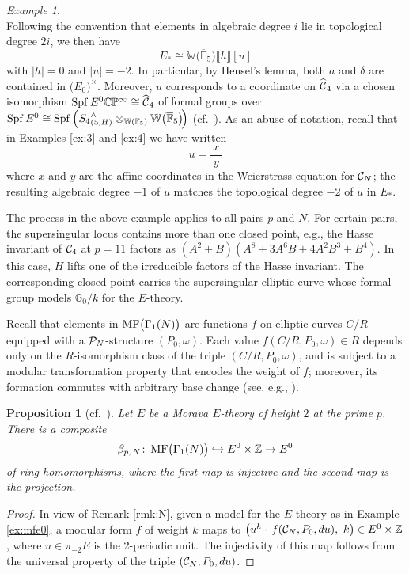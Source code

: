 \documentclass{gtpart}
\newtheorem{prop}[thm]{Proposition}
\theoremstyle{definition}
\theoremstyle{remark}
\newtheorem{ex}[thm]{Example}
\def\co{\colon\thinspace}
\newcommand{\mb}[1]{\mathbb{#1}}
\newcommand{\Spf}{{\rm Spf\thinspace}}
\newcommand{\cF}{\overline {\mb F}}
\newcommand{\CC}{{\cal C}}
\newcommand{\CP}{{\cal P}}
\newcommand{\BC}{{\mb C}}
\newcommand{\BF}{{\mb F}}
\newcommand{\BG}{{\mb G}}
\newcommand{\BP}{{\mb P}}
\newcommand{\BW}{{\mb W}}
\newcommand{\BZ}{{\mb Z}}
\newcommand{\HCC}{\widehat{~\!\!\CC}}
\newcommand{\MF}{{\rm MF}}
\newcommand{\B}{\beta}
\renewcommand{\d}{\delta}
\newcommand{\G}{\Gamma}
\newcommand{\lb}{\llbracket}
\newcommand{\rb}{\rrbracket}
\renewcommand{\=}{\approx}
\renewcommand{\-}{\sim}
\numberwithin{equation}{section}
\numberwithin{thm}{section}
\begin{document}
\begin{ex}
\[ \]
 Following the convention that elements in algebraic degree $i$ lie in topological degree $2 i$, we then have 
 \[
  E_* \cong \BW \big( \cF_5 \big) \lb h \rb [u] 
 \]
 with $|h| = 0$ and $|u| = -2$.  
 In particular, by Hensel's lemma, both $a$ and $\d$ are contained in $\big( E_0 \big)^{\!\times}$.  
 Moreover, $u$ corresponds to a coordinate on $\HCC_4$ 
 via a chosen isomorphism $\Spf E^0 \BC\BP^\infty \cong \HCC_4$ of formal groups over 
 $\Spf E^0 \cong \Spf\!\left( {S_4}^\wedge_{(5,H)} \otimes_{\BW(\BF_5)} \BW \big( \cF_5 \big) \!\right)$ (cf.~\cite[Definition 1.2]{AHS01}).  
 As an abuse of notation, recall that in Examples \ref{ex:3} and \ref{ex:4} we have written 
 \[
  u = \frac{~\!x~\!}{y} 
 \]
 where $x$ and $y$ are the affine coordinates in the Weierstrass equation for $\CC_N$; 
 the resulting algebraic degree $-1$ of $u$ matches the topological degree $-2$ of $u$ in $E_*$.  
\end{ex}
The process in the above example applies to all pairs $p$ and $N$.  
For certain pairs, the supersingular locus contains more than one closed point, 
e.g., the Hasse invariant of $\CC_4$ at $p = 11$ factors as $(A^2 + B) (A^8 + 3 A^6 B + 4 A^2 B^3 + B^4)$.  
In this case, $H$ lifts one of the irreducible factors of the Hasse invariant.  
The corresponding closed point carries the supersingular elliptic curve whose formal group models $\BG_0 / k$ for the $E$-theory.  

Recall that elements in $\MF\big(\G_1(N)\big)$ are functions $f$ on elliptic curves $C/R$ equipped with a $\CP_N$-structure $(P_0,\omega)$.  
Each value $f(C/R, P_0, \omega) \in R$ 
depends only on the $R$-isomorphism class of the triple $(C/R, P_0, \omega)$, 
and is subject to a modular transformation property that encodes the weight of $f$; moreover, its formation commutes with arbitrary base change 
(see, e.g., \cite[Section 1.2]{padicprop}).  
\begin{prop}[cf.~{\cite[Lemma 6.3]{BOSS}}]
 \label{prop:mfe0}
 Let $E$ be a Morava $E$-theory of height $2$ at the prime $p$.  
 There is a composite 
 \[
  \B_{p,\,N} \co \MF\big(\G_1(N)\big) \hookrightarrow E^0 \times \BZ \to E^0 
 \]
 of ring homomorphisms, 
 where the first map is injective and the second map is the projection.  
\end{prop}
\begin{proof}
 In view of Remark \ref{rmk:N}, given a model for the $E$-theory as in Example \ref{ex:mfe0}, 
 a modular form $f$ of weight $k$ maps to $\big( u^k \cdot \, f(\CC_N, P_0, du), ~ k \big) \in E^0 \times \BZ$, where $u \in \pi_{-2} E$ is the 2-periodic unit.  
 The injectivity of this map follows from the universal property of the triple $(\CC_N, P_0, du)$.  
\end{proof}
\end{document}
